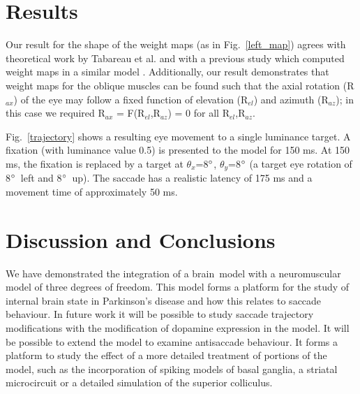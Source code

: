 \documentclass[11pt, a4paper]{article}
\newcommand{\brain}{brain}
\newcommand{\mycite}[1]{\cite{#1}}
\begin{document}


\section{Results}

Our result for the shape of the weight maps (as in
Fig.~\ref{left_map}) agrees with theoretical work by Tabareau et
al. \mycite{tabareau_geometry_2007} and with a previous study which
computed weight maps in a similar
model \mycite{arai_two-dimensional_1994}. Additionally, our result
demonstrates that weight maps for the oblique muscles can be found
such that the axial rotation (R$_{ax}$) of the eye may follow a fixed
function of elevation (R$_{el}$) and azimuth (R$_{az}$); in this case
we required R$_{ax}$ = F(R$_{el}$,R$_{az}$) = 0 for all
R$_{el}$,R$_{az}$.

Fig.~\ref{trajectory} shows a resulting eye movement to a single
luminance target. A fixation (with luminance value 0.5) is presented
to the model for 150 ms. At 150 ms, the fixation is replaced by a
target at $\theta_{x}$=8$\degree$, $\theta_{y}$=8$\degree$ (a target
eye rotation of 8$\degree$~left and 8$\degree$~up). The saccade has a
realistic latency of 175 ms and a movement time of approximately 50
ms.

\section{Discussion and Conclusions}

We have demonstrated the integration of a \brain~model with a
neuromuscular model of three degrees of freedom. This model forms a
platform for the study of internal brain state in Parkinson's disease
and how this relates to saccade behaviour.
In future work it will be
possible to study saccade trajectory modifications with the
modification of dopamine expression in the model. It will be possible
to extend the model to examine antisaccade behaviour. It forms a
platform to study the effect of a more detailed treatment of portions
of the model, such as the incorporation of spiking models of basal
ganglia, a striatal microcircuit or a detailed simulation of the
superior colliculus.
\end{document}
